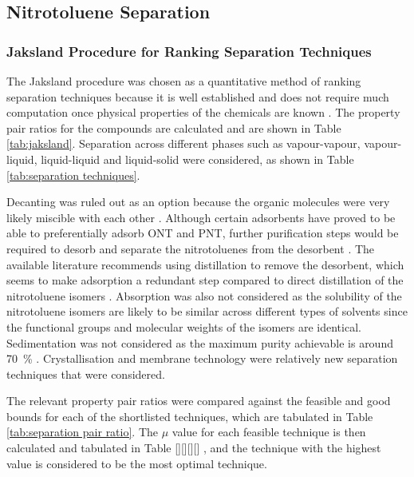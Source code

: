 \subsection{Nitrotoluene Separation}
\label{app:ntol separation}
\subsubsection{Jaksland Procedure for Ranking Separation Techniques}
The Jaksland procedure was chosen as a quantitative method of ranking separation techniques because it is well established and does not require much computation once physical properties of the chemicals are known \cite{jaksland_separation_1995}. The property pair ratios for the compounds are calculated and are shown in Table \ref{tab:jaksland}. Separation across different phases such as vapour-vapour, vapour-liquid, liquid-liquid and liquid-solid were considered, as shown in Table \ref{tab:separation techniques}.

Decanting was ruled out as an option because the organic molecules were very likely miscible with each other \cite{merck_solvent_2021}. Although certain adsorbents have proved to be able to preferentially adsorb ONT and PNT, further purification steps would be required to desorb and separate the nitrotoluenes from the desorbent \cite{zhao_new_2016}. The available literature recommends using distillation to remove the desorbent, which seems to make adsorption a redundant step compared to direct distillation of the nitrotoluene isomers \cite{zinnen_ep0181106a2_1984}. Absorption was also not considered as the solubility of the nitrotoluene isomers are likely to be similar across different types of solvents since the functional groups and molecular weights of the isomers are identical. Sedimentation was not considered as the maximum purity achievable is around \SI{70}{\percent} \cite{seider_product_2009}. Crystallisation and membrane technology were relatively new separation techniques that were considered. 

The relevant property pair ratios were compared against the feasible and good bounds for each of the shortlisted techniques, which are tabulated in Table \ref{tab:separation pair ratio}. The $\mu$ value for each feasible technique is then calculated and tabulated in Table [][][][] , and the technique with the highest value is considered to be the most optimal technique. 

